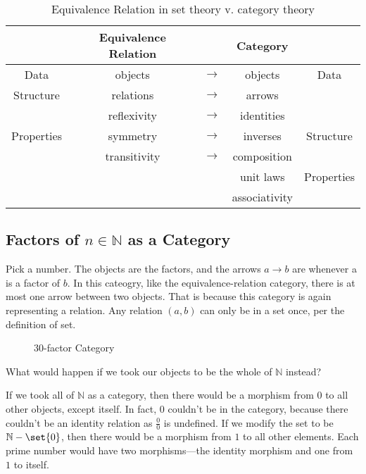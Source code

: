 \begin{table}
    \centering %
    \begin{tabular}{ ccccc } %
    \hline
    & Equivalence Relation & & Category & \\ \hline
    Data & objects & $\rightarrow$ & objects& Data\\
    Structure & relations & $\rightarrow$ & arrows & \\ \hline
    & reflexivity & $\rightarrow$ & identities & \\
    Properties & symmetry & $\rightarrow$ & inverses & Structure \\
    & transitivity & $\rightarrow$ & composition & \\\hline
    & & & unit laws& Properties \\
    & & & associativity &
    \\\hline
    \end{tabular}
    \caption{Equivalence Relation in set theory v. category theory}
\end{table}
\subsection{Factors of $n\in\mathbb{N}$ as a Category}
Pick a number. The objects are the factors, and the arrows $a\rightarrow b$ are
whenever a is a factor of $b$. In this cateogry, like the equivalence-relation
category, there is at most one arrow between two objects. That is because this
category is again representing a relation. Any relation $(a, b)$ can only be in
a set once, per the definition of set.
\begin{figure}[H]
    \begin{center}

\end{center}
\caption{30-factor Category}
\end{figure}
\begin{ttta}
What would happen if we took our objects to be the whole of $\mathbb{N}$ instead?
\end{ttta}
If we took all of $\mathbb{N}$ as a category, then there would be a morphism
from $0$ to all other objects, except itself. In fact, $0$ couldn't be in the
category, because there couldn't be an identity relation as $\frac{0}{0}$ is
undefined. If we modify the set to be $\mathbb{N} - \set{0}$, then there would
be a morphism from $1$ to all other elements. Each prime number would have two
morphisms---the identity morphism and one from $1$ to itself.
